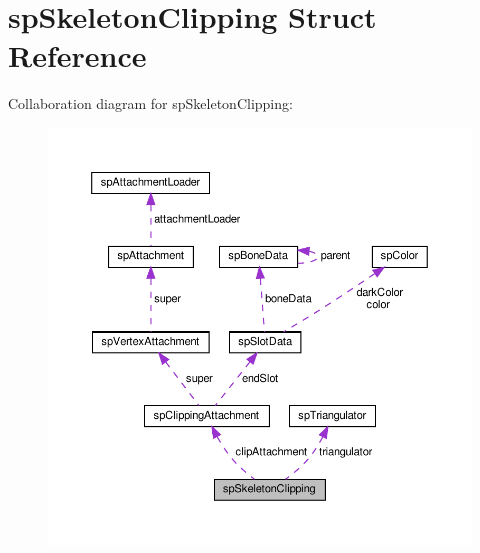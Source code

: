 \hypertarget{structspSkeletonClipping}{}\section{sp\+Skeleton\+Clipping Struct Reference}
\label{structspSkeletonClipping}


Collaboration diagram for sp\+Skeleton\+Clipping\+:
\nopagebreak
\begin{figure}[H]
\begin{center}
\leavevmode
\includegraphics[width=350pt]{structspSkeletonClipping__coll__graph}
\end{center}
\end{figure}

